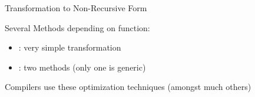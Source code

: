 \begin{frame}{Transformation to Non-Recursive Form}
  \bigskip\bigskip

  \large
  Several Methods depending on function:
  \begin{itemize}
  \item {}: very simple transformation
  \item {}: two methods (only one is generic)
  \end{itemize}
    \bigskip
  
  Compilers use these optimization techniques
  {\normalsize (amongst much others)}
\end{frame}
